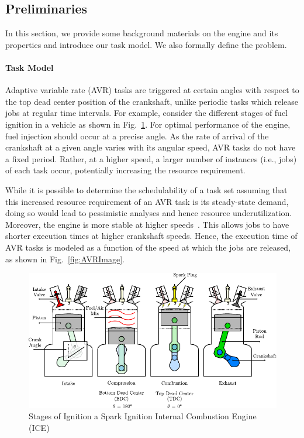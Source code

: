 \subsection{Preliminaries}
\label{sec:prelims}

In this section, we provide some background materials on the engine and its properties and introduce our task model.
We also formally define the problem.
\paragraph{Task Model}
Adaptive variable rate (AVR) tasks are triggered at certain angles with respect to the top dead center position of the crankshaft, unlike periodic tasks which release jobs at regular time intervals.
For example, consider the different stages of fuel ignition in a vehicle as shown in Fig.~\ref{fig:Engine}.
For optimal performance of the engine, fuel injection should occur at a precise angle.
As the rate of arrival of the crankshaft at a given angle varies with its angular speed, AVR tasks do not have a fixed period.
Rather, at a higher speed, a larger number of instances (i.e., jobs) of each task occur, potentially increasing the resource requirement.

While it is possible to determine the schedulability of a task set assuming that this increased resource requirement of an AVR task is its steady-state demand, doing so would lead to pessimistic analyses and hence resource underutilization.
Moreover, the engine is more stable at higher speeds~\cite{dbuttle_real-time_nodate}.
This allows jobs to have shorter execution times at higher crankshaft speeds.
Hence, the execution time of AVR tasks is modeled as a function of the speed at which the jobs are released, as shown in Fig.~\ref{fig:AVRImage}.


\begin{figure}
    \centering
    \includegraphics[width=0.9\linewidth]{fig/combustionCycle-4step.pdf}
    \caption{Stages of Ignition a Spark Ignition Internal Combustion Engine (ICE)}
    \label{fig:Engine}
\end{figure}

